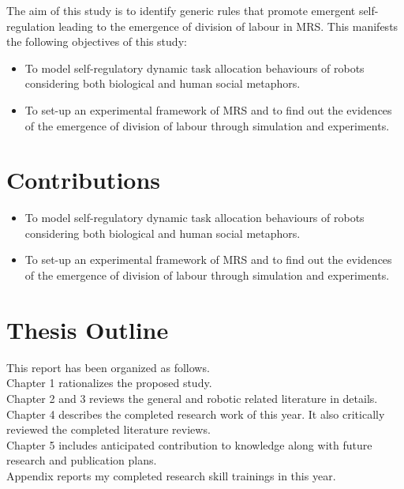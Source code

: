The aim of this study is to identify generic rules that promote emergent self-regulation leading to the emergence of division of labour in MRS. 
This manifests the following objectives of this study:
\begin{itemize}
\item To model self-regulatory dynamic task allocation behaviours of robots considering both biological and human social metaphors.
\item To set-up an experimental framework of MRS and to find out the evidences of the emergence of division of labour through simulation and experiments. 
\end{itemize}
\section{Contributions}
\begin{itemize}
\item To model self-regulatory dynamic task allocation behaviours of robots considering both biological and human social metaphors.
\item To set-up an experimental framework of MRS and to find out the evidences of the emergence of division of labour through simulation and experiments. 
\end{itemize}
\section{Thesis Outline}
This report has been organized as follows.\\ 
Chapter 1 rationalizes the proposed study. \\
Chapter 2 and 3 reviews the general and robotic related literature in details.\\
Chapter 4 describes the completed research work of  this year. It also critically reviewed the completed  literature reviews.\\
Chapter 5 includes anticipated contribution to knowledge along with future research and publication plans.\\
Appendix reports my completed research skill trainings in this year.



